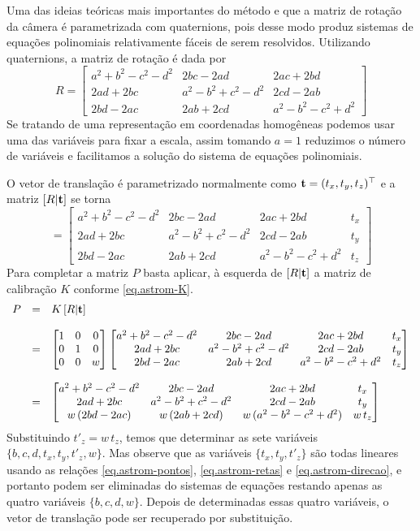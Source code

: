 Uma das ideias teóricas mais importantes do método e que a matriz de rotação da câmera é parametrizada com quaternions, pois desse modo produz sistemas de equações polinomiais relativamente fáceis de serem resolvidos. Utilizando quaternions, a matriz de rotação é dada por
\begin{equation*}
R=
\begin{bmatrix}
a^2+b^2-c^2-d^2&2bc-2ad&2ac+2bd\\
2ad+2bc&a^2-b^2+c^2-d^2&2cd-2ab\\
2bd-2ac&2ab+2cd&a^2-b^2-c^2+d^2
\end{bmatrix}
\end{equation*}
Se tratando de uma representação em coordenadas homogêneas podemos usar uma das variáveis para fixar a escala, assim tomando $a=1$ reduzimos o número de variáveis e facilitamos a solução do sistema de equações polinomiais.

O vetor de translação é parametrizado normalmente como ${\bf t}=(t_x,t_y,t_z)^\top$ e a matriz $[R|{\bf t}]$ se torna
\begin{equation*}
[R|{\bf t}]=
\begin{bmatrix}
a^2+b^2-c^2-d^2&2bc-2ad&2ac+2bd&t_x\\
2ad+2bc&a^2-b^2+c^2-d^2&2cd-2ab&t_y\\
2bd-2ac&2ab+2cd&a^2-b^2-c^2+d^2&t_z
\end{bmatrix}
\end{equation*}
Para completar a matriz $P$ basta aplicar, à esquerda de $[R|{\bf t}]$ a matriz de calibração $K$ conforme \ref{eq.astrom-K}.
\begin{equation*}
\begin{array}{rcl}
P&=&K\,[R|{\bf t}]\\\\
&=&
\begin{bmatrix}
1&0&0\\
0&1&0\\
0&0&w
\end{bmatrix}
\begin{bmatrix}
a^2+b^2-c^2-d^2&2bc-2ad&2ac+2bd&t_x\\
2ad+2bc&a^2-b^2+c^2-d^2&2cd-2ab&t_y\\
2bd-2ac&2ab+2cd&a^2-b^2-c^2+d^2&t_z
\end{bmatrix}\\\\
&=&
\begin{bmatrix}
a^2+b^2-c^2-d^2&2bc-2ad&2ac+2bd&t_x\\
2ad+2bc&a^2-b^2+c^2-d^2&2cd-2ab&t_y\\
w\,(2bd-2ac)&w\,(2ab+2cd)&w\,(a^2-b^2-c^2+d^2)&w\,t_z
\end{bmatrix}
\end{array}
\end{equation*} 
Substituindo $t'_z=w\,t_z$, temos que determinar as sete variáveis $\{b,c,d,t_x,t_y,t'_z,w\}$. Mas observe que as variáveis $\{t_x,t_y,t'_z\}$ são todas lineares usando as relações \ref{eq.astrom-pontos}, \ref{eq.astrom-retas} e \ref{eq.astrom-direcao}, e portanto podem ser eliminadas do sistemas de equações restando apenas as quatro variáveis $\{b,c,d,w\}$. Depois de determinadas essas quatro variáveis, o vetor de translação pode ser recuperado por substituição. 

